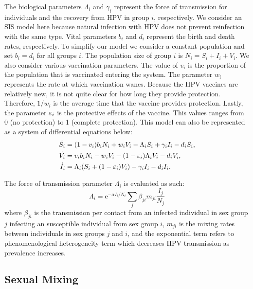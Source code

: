 \documentclass[12pt]{article}
\begin{document}
The biological parameters $\Lambda_i$ and $\gamma_i$ represent the force of transmission for individuals and the recovery from HPV in group $i$, respectively.  We consider an SIS model here because natural infection with HPV does not prevent reinfection with the same type.  Vital parameters $b_i$ and $d_i$ represent the birth and death rates, respectively.  To simplify our model we consider a constant population and set $b_i=d_i$ for all groups $i$.  The population size of group $i$ is $N_i=S_i+I_i+V_i$.  We also consider various vaccination parameters.  The value of $v_i$ is the proportion of the population that is vaccinated entering the system.  The parameter $w_i$ represents the rate at which vaccination wanes.  Because the HPV vaccines are relatively new, it is not quite clear for how long they provide protection.  Therefore, $1/w_i$ is the average time that the vaccine provides protection.  Lastly, the parameter $\varepsilon_i$ is the protective effects of the vaccine. This values ranges from 0 (no protection) to 1 (complete protection).  This model can also be represented as a system of differential equations below:
\begin{subequations}
\begin{align}
\dot{S_i} &= (1-v_i)b_iN_i + w_iV_i - \Lambda_iS_i + \gamma_i I_i - d_iS_i,\\
\dot{V_i} &= v_ib_iN_i - w_iV_i - (1-\varepsilon_i)\Lambda_iV_i  - d_iV_i,\\
\dot{I_i} &=  \Lambda_i(S_i+(1-\varepsilon_i)V_i) - \gamma_i I_i - d_iI_i.\end{align}
\end{subequations}

The force of transmission parameter $\Lambda_i$ is evaluated as such:
\begin{equation}
\Lambda_i = \text{e}^{-\alpha I_i/N_i}\sum_j \beta_{ji}m_{ji}\frac{I_j}{N_j}
\end{equation}
where $\beta_{ji}$ is the transmission per contact from an infected individual in sex group $j$ infecting an susceptible individual from sex group $i$, $m_{ji}$ is the mixing rates between individuals in sex groups $j$ and $i$, and the exponential term refers to phenomenological heterogeneity term which decreases HPV transmission as prevalence increases.  
\subsection{Sexual Mixing}
\end{document}
